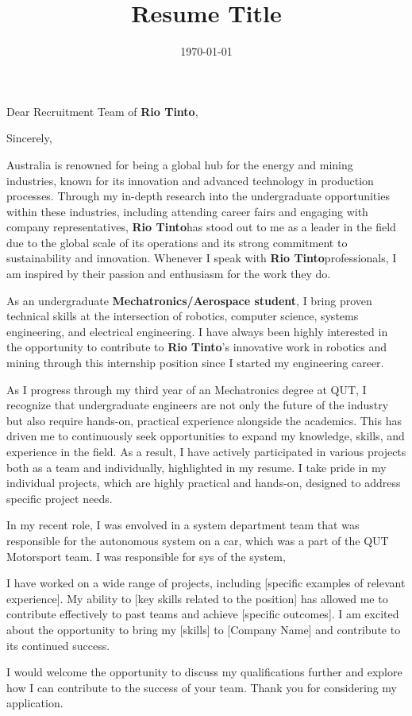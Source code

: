 \documentclass[11pt,a4paper,sans]{moderncv}        %
\title{Resume Title}                               %
\newcommand{\companyname}{\textbf{Rio Tinto}}
\begin{document}
\recipient{\companyname}{Brisbane, QLD 4000}
\date{\today}
\opening{Dear Recruitment Team of \companyname,}
\closing{Sincerely,}
\makelettertitle

Australia is renowned for being a global hub for the energy and mining industries, 
known for its innovation and advanced technology in production processes. 
Through my in-depth research into the undergraduate opportunities within these industries, 
including attending career fairs and engaging with company representatives, 
\companyname\space has stood out to me as a leader in the field due to the global scale of its operations 
and its strong commitment to sustainability and innovation. Whenever I speak with \companyname\space professionals, 
I am inspired by their passion and enthusiasm for the work they do.

As an undergraduate \textbf{Mechatronics/Aerospace student},
 I bring proven technical skills at the intersection of robotics, computer science, systems engineering,
 and electrical engineering. I have always been highly interested in the opportunity to contribute to \companyname’s 
 innovative work in robotics and mining through this internship position since I started my engineering career.

 As I progress through my third year of an Mechatronics degree at QUT, 
 I recognize that undergraduate engineers are not only the future of the industry but 
 also require hands-on, practical experience alongside the academics. 
 This has driven me to continuously seek opportunities to expand my knowledge, skills, 
 and experience in the field. 
 As a result, I have actively participated in various projects both as a team and individually, highlighted in my resume. 
 I take pride in my individual projects, which are highly practical and hands-on, 
 designed to address specific project needs.

In my recent role, I was envolved in a system department team that was responsible for the 
autonomous system on a car, which was a part of the QUT Motorsport team.
I was responsible for sys of the system,


I have worked on a wide range of projects, including [specific examples of relevant experience]. 
My ability to [key skills related to the position] has allowed me to contribute effectively to past teams and achieve [specific outcomes]. 
I am excited about the opportunity to bring my [skills] to [Company Name] and contribute to its continued success.

I would welcome the opportunity to discuss my qualifications further and explore how I can contribute to the success of your team. Thank you for considering my application.

\makeletterclosing
\end{document}
